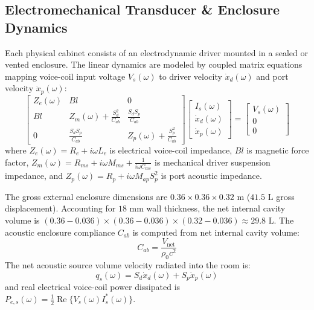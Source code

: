 \documentclass[11pt,a4paper]{article}
\begin{document}
\subsection{Electromechanical Transducer \& Enclosure Dynamics}
Each physical cabinet consists of an electrodynamic driver mounted in a sealed or vented enclosure. The linear dynamics are modeled by coupled matrix equations mapping voice-coil input voltage $V_s(\omega)$ to driver velocity $\dot{x}_d(\omega)$ and port velocity $\dot{x}_p(\omega)$:
\begin{equation}
    \begin{bmatrix}
        Z_e(\omega) & B l & 0 \\
        B l & Z_m(\omega) + \frac{S_d^2}{C_{ab}} & \frac{S_d S_p}{C_{ab}} \\
        0 & \frac{S_d S_p}{C_{ab}} & Z_p(\omega) + \frac{S_p^2}{C_{ab}}
    \end{bmatrix}
    \begin{bmatrix}
        I_s(\omega) \\
        \dot{x}_d(\omega) \\
        \dot{x}_p(\omega)
    \end{bmatrix}
    =
    \begin{bmatrix}
        V_s(\omega) \\
        0 \\
        0
    \end{bmatrix}
\end{equation}
where $Z_e(\omega) = R_e + i \omega L_e$ is electrical voice-coil impedance, $B l$ is magnetic force factor, $Z_m(\omega) = R_{ms} + i \omega M_{ms} + \frac{1}{i \omega C_{ms}}$ is mechanical driver suspension impedance, and $Z_p(\omega) = R_p + i \omega M_{ap} S_p^2$ is port acoustic impedance.

The gross external enclosure dimensions are $0.36 \times 0.36 \times 0.32\text{ m}$ ($41.5\text{ L}$ gross displacement). Accounting for $18\text{ mm}$ wall thickness, the net internal cavity volume is $(0.36 - 0.036) \times (0.36 - 0.036) \times (0.32 - 0.036) \approx 29.8\text{ L}$. The acoustic enclosure compliance $C_{ab}$ is computed from net internal cavity volume:
\begin{equation}
    C_{ab} = \frac{V_{\text{net}}}{\rho_0 c^2}
\end{equation}
The net acoustic source volume velocity radiated into the room is:
\begin{equation}
    q_s(\omega) = S_d \dot{x}_d(\omega) + S_p \dot{x}_p(\omega)
\end{equation}
and real electrical voice-coil power dissipated is $P_{e, s}(\omega) = \frac{1}{2} \operatorname{Re}\{ V_s(\omega) I_s^*(\omega) \}$.
\end{document}
